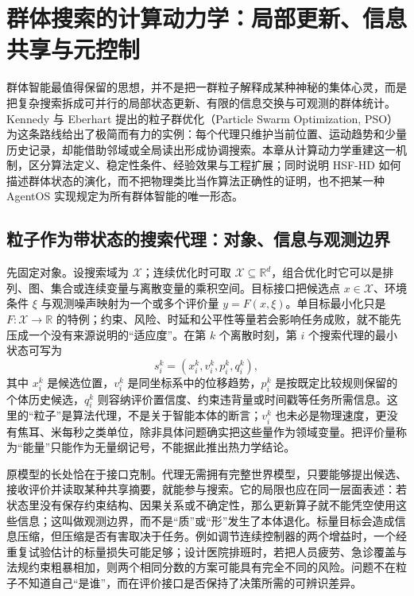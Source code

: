 \chapter{群体搜索的计算动力学：局部更新、信息共享与元控制}
\label{chp:collective_intelligence}

群体智能最值得保留的思想，并不是把一群粒子解释成某种神秘的集体心灵，而是把复杂搜索拆成可并行的局部状态更新、有限的信息交换与可观测的群体统计。Kennedy 与 Eberhart 提出的粒子群优化（Particle Swarm Optimization, PSO）为这条路线给出了极简而有力的实例：每个代理只维护当前位置、运动趋势和少量历史记录，却能借助邻域或全局读出形成协调搜索。本章从计算动力学重建这一机制，区分算法定义、稳定性条件、经验效果与工程扩展；同时说明 HSF-HD 如何描述群体状态的演化，而不把物理类比当作算法正确性的证明，也不把某一种 AgentOS 实现规定为所有群体智能的唯一形态。

\section{粒子作为带状态的搜索代理：对象、信息与观测边界}
\label{sec:section_2352}

先固定对象。设搜索域为 $\mathcal{X}$；连续优化时可取 $\mathcal{X}\subseteq\mathbb{R}^{d}$，组合优化时它可以是排列、图、集合或连续变量与离散变量的乘积空间。目标接口把候选点 $x\in\mathcal{X}$、环境条件 $\xi$ 与观测噪声映射为一个或多个评价量 $y=F(x,\xi)$。单目标最小化只是 $F:\mathcal{X}\to\mathbb{R}$ 的特例；约束、风险、时延和公平性等量若会影响任务成败，就不能先压成一个没有来源说明的“适应度”。在第 $k$ 个离散时刻，第 $i$ 个搜索代理的最小状态可写为
\[
s_i^k=(x_i^k,v_i^k,p_i^k,q_i^k),
\]
其中 $x_i^k$ 是候选位置，$v_i^k$ 是同坐标系中的位移趋势，$p_i^k$ 是按既定比较规则保留的个体历史候选，$q_i^k$ 则容纳评价置信度、约束违背量或时间戳等任务所需信息。这里的“粒子”是算法代理，不是关于智能本体的断言；$v_i^k$ 也未必是物理速度，更没有焦耳、米每秒之类单位，除非具体问题确实把这些量作为领域变量。把评价量称为“能量”只能作为无量纲记号，不能据此推出热力学结论。

原模型的长处恰在于接口克制。代理无需拥有完整世界模型，只要能够提出候选、接收评价并读取某种共享摘要，就能参与搜索。它的局限也应在同一层面表述：若状态里没有保存约束结构、因果关系或不确定性，那么更新算子就不能凭空使用这些信息；这叫做观测边界，而不是“质”或“形”发生了本体退化。标量目标会造成信息压缩，但压缩是否有害取决于任务。例如调节连续控制器的两个增益时，一个经重复试验估计的标量损失可能足够；设计医院排班时，若把人员疲劳、急诊覆盖与法规约束粗暴相加，则两个相同分数的方案可能具有完全不同的风险。问题不在粒子不知道自己“是谁”，而在评价接口是否保持了决策所需的可辨识差异。

